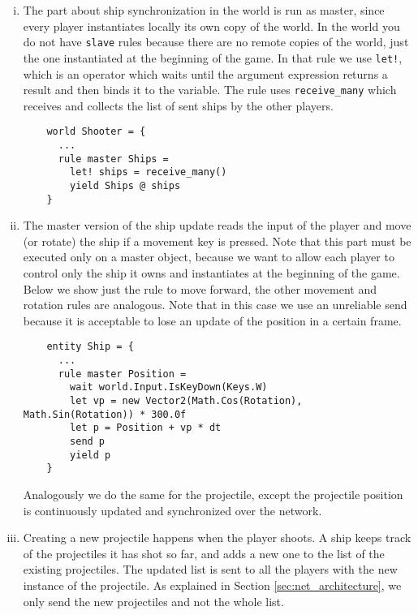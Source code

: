 \begin{enumerate}[(i)]
	\item The part about ship synchronization in the world is run as master, since every player instantiates locally its own copy of the world. In the world you do not have \texttt{slave} rules because there are no remote copies of the world, just the one instantiated at the beginning of the game. In that rule we use \texttt{let!}, which is an operator which waits until the argument expression returns a result and then binds it to the variable. The rule uses \texttt{receive\_many} which receives and collects the list of sent ships by the other players.
	
	\begin{lstlisting}
	world Shooter = {
	  ...
	  rule master Ships =
	    let! ships = receive_many()
	    yield Ships @ ships
    }
	\end{lstlisting}
	
	\item The master version of the ship update reads the input of the player and move (or rotate) the ship if a movement key is pressed. Note that this part must be executed only on a master object, because we want to allow each player to control only the ship it owns and instantiates at the beginning of the game. Below we show just the rule to move forward, the other movement and rotation rules are analogous. Note that in this case we use an unreliable send because it is acceptable to lose an update of the position in a certain frame.
	
	\begin{lstlisting}
	entity Ship = {
	  ...
	  rule master Position =
	    wait world.Input.IsKeyDown(Keys.W)
	    let vp = new Vector2(Math.Cos(Rotation), Math.Sin(Rotation)) * 300.0f
	    let p = Position + vp * dt
	    send p
	    yield p
	}
	\end{lstlisting}
	
	Analogously we do the same for the projectile, except the projectile position is continuously updated and synchronized over the network.
	
	\item Creating a new projectile happens when the player shoots. A ship keeps track of the projectiles it has shot so far, and adds a new one to the list of the existing projectiles. The updated list is sent to all the players with the new instance of the projectile. As explained in Section \ref{sec:net_architecture}, we only send the new projectiles and not the whole list.
	

\end{enumerate}
